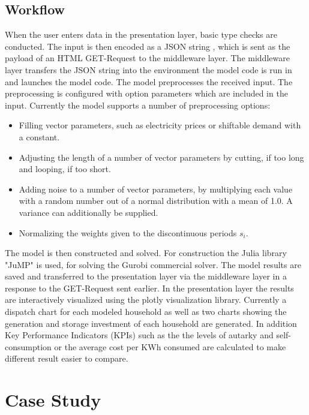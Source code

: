 \documentclass[
	11pt,								%
	DIV10,								%
	a4paper,         					%
	oneside,							%
	headheight=20pt,					%
	footheight=20pt,					%
    parskip=full,						%
    listof=totoc,						%
	bibliography=totoc,					%
	index=totoc,						%
]{scrartcl}
\begin{document}
\subsection{Workflow}
When the user enters data in the presentation layer, basic type checks are conducted. The input is then encoded as a JSON string \cite{crockfordIntroducingJSON}, which is sent as the payload of an HTML GET-Request \cite{fieldingArchitecturalStylesDesign2000} to the middleware layer. The middleware layer transfers the JSON string into the environment the model code is run in and launches the model code. The model preprocesses the received input. The preprocessing is configured with option parameters which are included in the input. Currently the model supports a number of preprocessing options:
\begin{itemize}
	\item Filling vector parameters, such as electricity prices or shiftable demand with a constant. 
	\item Adjusting the length of a number of vector parameters by cutting, if too long and looping, if too short.
	\item Adding noise to a number of vector parameters, by multiplying each value with a random number out of a normal distribution with a mean of 1.0. A variance can additionally be supplied.
	\item Normalizing the weights given to the discontinuous periods $s_i$.
\end{itemize} 
The model is then constructed and solved. For construction the Julia library "JuMP" \cite{JuMPJlModeling2019}is used, for solving the Gurobi commercial solver. \cite{GurobiOptimization} The model results are saved and transferred to the presentation layer via the middleware layer in a response to the GET-Request sent earlier. In the presentation layer the results are interactively visualized using the plotly visualization library. \cite{PlotlyJavascriptOpen2019} Currently a dispatch chart for each modeled household as well as two charts showing the generation and storage investment of each household are generated. In addition Key Performance Indicators (KPIs) such as the the levels of autarky and self-consumption or the average cost per KWh consumed are calculated to make different result easier to compare.

\newpage
{}	

\section{Case Study}
\end{document}
